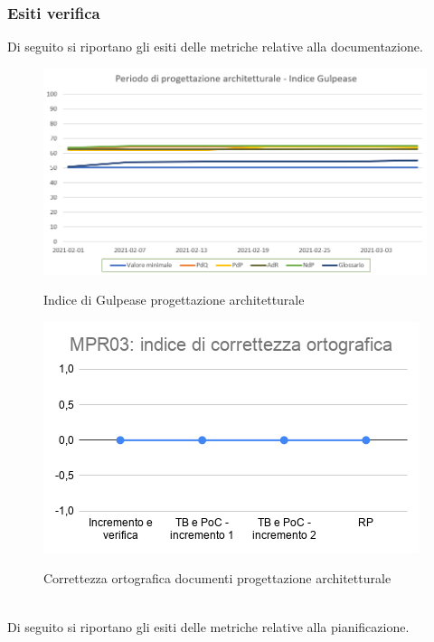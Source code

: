 \subsubsection{Esiti verifica}
Di seguito si riportano gli esiti delle metriche relative alla documentazione.
\begin{figure}[h]
	\centering
	\includegraphics[scale=0.5]{Immagini/GulpeaseProgettazioneArchitetturale}\\
	\caption{Indice di Gulpease progettazione architetturale}
	\label{fig:GulpeasePArchitetturale}
\end{figure}
\begin{figure}[h]
	\centering
	\includegraphics[scale=0.6]{Immagini/MPR03_cortografica}\\
	\caption{Correttezza ortografica documenti progettazione architetturale}
	\label{fig:CortOrtograficaPArchitetturale}
\end{figure}
\\
Di seguito si riportano gli esiti delle metriche relative alla pianificazione.
